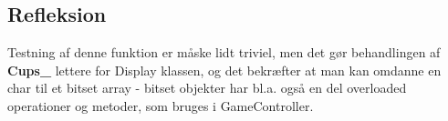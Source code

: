 \documentclass[Modultest/Modultest_main.tex]{subfiles}
\begin{document}
\subsection{Refleksion}
Testning af denne funktion er måske lidt triviel, men det gør behandlingen af \textbf{Cups\_} lettere for Display klassen, og det bekræfter at man kan omdanne en char til et bitset array - bitset objekter har bl.a. også en del overloaded operationer og metoder, som bruges i GameController. 
\end{document}
